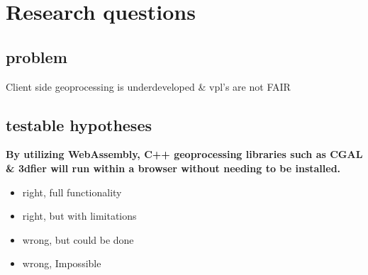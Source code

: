 % 
% 
% 
% 
% 
\newpage
\section{Research questions}

\subsection{problem}
Client side geoprocessing is underdeveloped \& vpl's are not FAIR 

\subsection{testable hypotheses}
\textbf{By utilizing WebAssembly, C++ geoprocessing libraries such as CGAL \& 3dfier will run within a browser without needing to be installed.}
\begin{itemize}
    \item right, full functionality
    \item right, but with limitations 
    \item wrong, but could be done
    \item wrong, Impossible 
\end{itemize}

